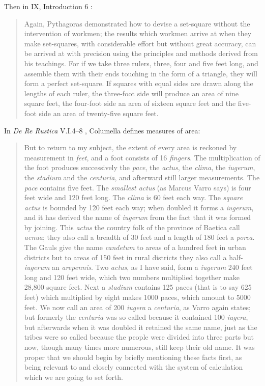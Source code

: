 Then in IX, Introduction 6 \cite[pp.~243--244]{vitruvius}:

\begin{quote}
Again, Pythagoras demonstrated how to devise a set-square without the intervention of workmen; the results which workmen
arrive at when they make set-squares, with considerable effort but without great accuracy, can be arrived at with precision
using the principles and methods derived from his teachings. For if we take three rulers, three, four and five feet long,
and assemble them with their ends touching in the form of a triangle, they will form a perfect set-square. If squares with equal
sides are drawn along the lengths of each ruler, the three-foot side will produce an area of nine square feet, the four-foot
side an area of sixteen square feet and the five-foot side an area of twenty-five square feet.
\end{quote}

In {\em De Re Rustica} V.I.4--8 \cite[pp.~5--7]{columellaII}, Columella defines  measures of area:

\begin{quote}
But to return to my subject, the extent of every area is reckoned by measurement in {\em feet}, and a foot consists of 16 {\em fingers}. The multiplication of the foot produces 
successively the {\em pace}, the {\em actus}, the {\em clima}, the {\em iugerum}, the {\em stadium} and the {\em centuria}, and afterward still larger measurements. The {\em pace} 
contains five feet. The {\em smallest actus} (as Marcus Varro says) is four feet wide and 120 feet long. The {\em clima} is 60 feet each way. The {\em square actus} is bounded by
120 feet each way; when doubled it forms a {\em iugerum}, and it has derived the name of {\em iugerum} from the fact that it was formed by joining. This {\em actus} the country folk
of the province of Baetica call {\em acnua}; they also call a breadth of 30 feet and a length of 180 feet a {\em porca}. The Gauls give the name  {\em candetum} to areas of a
hundred feet in urban districts but to areas of 150 feet in rural districts they also call a half-{\em iugerum} an {\em arepennis}. Two {\em actus}, as I have said, form a {\em iugerum} 
240 feet long and 120 feet wide, which two numbers multiplied together make 28,800 square feet. Next a {\em stadium} contains 125 paces (that is to say 625 feet) which
multiplied by eight makes 1000 paces, which amount to 5000 feet. We now call an area of 200 {\em iugera} a {\em centuria}, as Varro again states; but formerly the {\em centuria}
was so called because it contained 100 {\em iugera}, but afterwards when it was doubled it retained the same name, just as the tribes were so called because the people were 
divided into three parts but now, though many times more numerous, still keep their old name. It was proper that we should begin by briefly mentioning these facts first, as being 
relevant to and closely connected with the system of calculation which we are going to set forth.
\end{quote}

